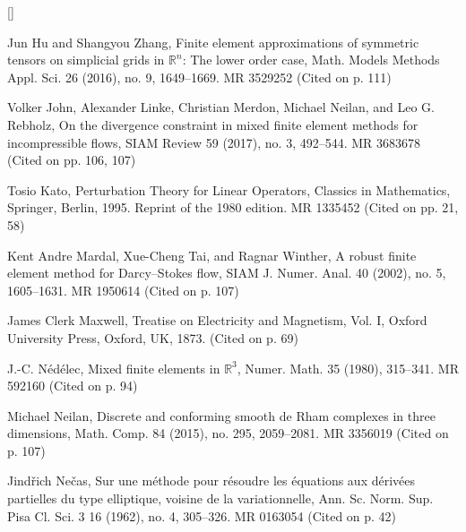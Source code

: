 \begin{list}{[]}{\setlength{\leftmargin}{2.7em}\setlength{\labelwidth}{2.2em}}
\item\label{bib:source-54}Jun Hu and Shangyou Zhang, Finite element approximations of symmetric tensors on simplicial grids in $\mathbb R^n$: The lower order case, Math. Models Methods Appl. Sci. 26 (2016), no. 9, 1649–1669. MR 3529252 (Cited on p. 111)

\item\label{bib:source-55}Volker John, Alexander Linke, Christian Merdon, Michael Neilan, and Leo G. Rebholz, On the divergence constraint in mixed finite element methods for incompressible flows, SIAM Review 59 (2017), no. 3, 492–544. MR 3683678 (Cited on pp. 106, 107)

\item\label{bib:source-56}Tosio Kato, Perturbation Theory for Linear Operators, Classics in Mathematics, Springer, Berlin, 1995. Reprint of the 1980 edition. MR 1335452 (Cited on pp. 21, 58)

\item\label{bib:source-57}Kent Andre Mardal, Xue-Cheng Tai, and Ragnar Winther, A robust finite element method for Darcy–Stokes flow, SIAM J. Numer. Anal. 40 (2002), no. 5, 1605–1631. MR 1950614 (Cited on p. 107)

\item\label{bib:source-58}James Clerk Maxwell, Treatise on Electricity and Magnetism, Vol. I, Oxford University Press, Oxford, UK, 1873. (Cited on p. 69)

\item\label{bib:source-59}J.-C. Nédélec, Mixed finite elements in $\mathbb R^3$, Numer. Math. 35 (1980), 315–341. MR 592160 (Cited on p. 94)

\item\label{bib:source-60}Michael Neilan, Discrete and conforming smooth de Rham complexes in three dimensions, Math. Comp. 84 (2015), no. 295, 2059–2081. MR 3356019 (Cited on p. 107)

\item\label{bib:source-61}Jindřich Nečas, Sur une méthode pour résoudre les équations aux dérivées partielles du type elliptique, voisine de la variationnelle, Ann. Sc. Norm. Sup. Pisa Cl. Sci. 3 16 (1962), no. 4, 305–326. MR 0163054 (Cited on p. 42)


\end{list}
